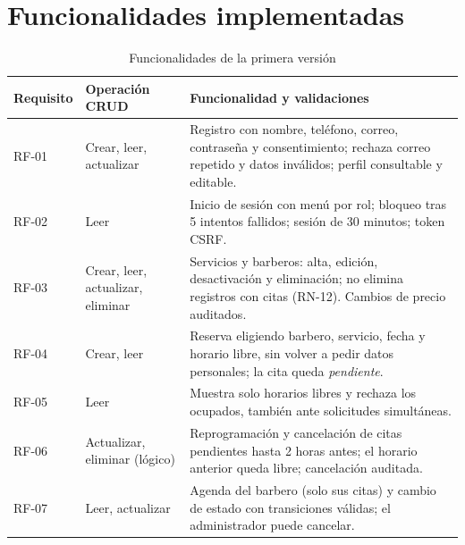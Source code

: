 \documentclass[12pt,a4paper,oneside]{article}
\begin{document}
\section{Funcionalidades implementadas}
\begin{table}[H]\centering\small
\begin{tabularx}{\textwidth}{>{\raggedright\arraybackslash}p{1.6cm}>{\raggedright\arraybackslash}p{3.3cm}Y}\toprule
\textbf{Requisito} & \textbf{Operaci\'on CRUD} & \textbf{Funcionalidad y validaciones}\\\midrule
RF-01 & Crear, leer, actualizar & Registro con nombre, tel\'efono, correo, contrase\~na y consentimiento; rechaza correo repetido y datos inv\'alidos; perfil consultable y editable.\\
RF-02 & Leer & Inicio de sesi\'on con men\'u por rol; bloqueo tras 5 intentos fallidos; sesi\'on de 30 minutos; token CSRF.\\
RF-03 & Crear, leer, actualizar, eliminar & Servicios y barberos: alta, edici\'on, desactivaci\'on y eliminaci\'on; no elimina registros con citas (RN-12). Cambios de precio auditados.\\
RF-04 & Crear, leer & Reserva eligiendo barbero, servicio, fecha y horario libre, sin volver a pedir datos personales; la cita queda \emph{pendiente}.\\
RF-05 & Leer & Muestra solo horarios libres y rechaza los ocupados, tambi\'en ante solicitudes simult\'aneas.\\
RF-06 & Actualizar, eliminar (l\'ogico) & Reprogramaci\'on y cancelaci\'on de citas pendientes hasta 2 horas antes; el horario anterior queda libre; cancelaci\'on auditada.\\
RF-07 & Leer, actualizar & Agenda del barbero (solo sus citas) y cambio de estado con transiciones v\'alidas; el administrador puede cancelar.\\\bottomrule
\end{tabularx}
\caption{Funcionalidades de la primera versi\'on}\end{table}
\end{document}
